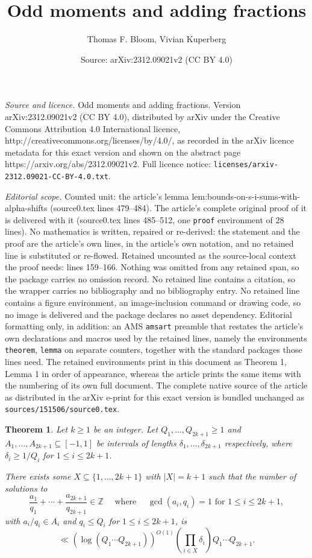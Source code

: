 \documentclass[10pt,a4paper]{amsart}
\title{Odd moments and adding fractions}
\author{Thomas F. Bloom, Vivian Kuperberg}
\date{Source: arXiv:2312.09021v2 (CC BY 4.0)}
\newtheorem{theorem}{Theorem}
\newcommand{\abs}[1]{\left\lvert #1\right\rvert}
\newcommand{\bbz}{\mathbb{Z}}
\newcommand{\brac}[1]{\left( #1\right)}
\newcommand{\ogcd}[2]{\gcd(#1,#2)}
\begin{document}
\maketitle

\noindent\emph{Source and licence.} Odd moments and adding fractions. Version arXiv:2312.09021v2 (CC BY 4.0), distributed by arXiv under the Creative Commons Attribution 4.0 International licence, http://creativecommons.org/licenses/by/4.0/, as recorded in the arXiv licence metadata for this exact version and shown on the abstract page https://arxiv.org/abs/2312.09021v2. Full licence notice: \texttt{licenses/arxiv-2312.09021-CC-BY-4.0.txt}.\par\smallskip

\noindent\textit{Editorial scope.} Counted unit: the article's lemma lem:bounds-on-s-i-sums-with-alpha-shifts (source0.tex lines 479--484). The article's complete original proof of it is delivered with it (source0.tex lines 485--512, one \texttt{proof} environment of 28 lines). No mathematics is written, repaired or re-derived: the statement and the proof are the article's own lines, in the article's own notation, and no retained line is substituted or re-flowed.  Retained uncounted as the source-local context the proof needs: lines 159--166.  Nothing was omitted from any retained span, so the package carries no omission record.  No retained line contains a citation, so the wrapper carries no bibliography and no bibliography entry.  No retained line contains a figure environment, an image-inclusion command or drawing code, so no image is delivered and the package declares no asset dependency.  Editorial formatting only, in addition: an AMS \texttt{amsart} preamble that restates the article's own declarations and macros used by the retained lines, namely the environments \texttt{theorem}, \texttt{lemma} on separate counters, together with the standard packages those lines need.  The retained environments print in this document as Theorem 1, Lemma 1 in order of appearance, whereas the article prints the same items with the numbering of its own full document.  The complete native source of the article as distributed in the arXiv e-print for this exact version is bundled unchanged as \texttt{sources/151506/source0.tex}.
\begin{theorem}\label{th-oddsum}
Let $k\geq 1$ be an integer. Let $Q_1,\ldots,Q_{2k+1}\geq 1$ and $A_1,\ldots,A_{2k+1}\subseteq [-1,1]$ be intervals of lengths $\delta_1,\ldots,\delta_{2k+1}$ respectively, where $\delta_i\geq 1/Q_i$ for $1\leq i\leq 2k+1$. 

There exists some $X\subseteq \{1,\ldots,2k+1\}$ with $\abs{X}=k+1$ such that the number of solutions to
\[\frac{a_1}{q_1}+\cdots+\frac{a_{2k+1}}{q_{2k+1}}\in \bbz\quad\textrm{ where }\quad\ogcd{a_i}{q_i}=1\textrm{ for }1\leq i\leq 2k+1,\] 
with $a_i/q_i\in A_i$ and $q_i\leq Q_i$ for $1\leq i\leq 2k+1$, is
\[\ll (\log(Q_1\cdots Q_{2k+1}))^{O(1)}\brac{\prod_{i\in X}\delta_i}Q_1\cdots Q_{2k+1}.\]
\end{theorem}
\end{document}
